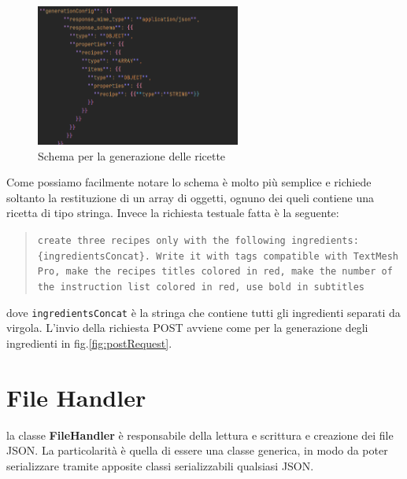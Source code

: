 \begin{figure}[H]
    \centering
    \includegraphics[width=0.6\textwidth,height=\textheight,keepaspectratio]{figures/chapter_1/recipeSchema.png}
    \caption{Schema per la generazione delle ricette}
    \label{fig:recipeSchema}
\end{figure}

Come possiamo facilmente notare lo schema è molto più semplice e richiede soltanto la restituzione di un array di oggetti, ognuno dei queli contiene una ricetta di tipo stringa.
Invece la richiesta testuale fatta è la seguente:
\begin{quote}
    \texttt{create three recipes only with the following ingredients: \{ingredientsConcat\}. Write it with tags compatible with TextMesh Pro, make the recipes titles colored in red, make the number of the instruction list colored in red, use bold in subtitles}
\end{quote}dove \texttt{ingredientsConcat} è la stringa che contiene tutti gli ingredienti separati da virgola.
L'invio della richiesta POST avviene come per la generazione degli ingredienti in fig.\ref{fig:postRequest}.

\section{File Handler}
la classe \textbf{FileHandler} è responsabile della lettura e scrittura e creazione dei file JSON. La particolarità è quella di essere una classe generica, in modo da poter serializzare tramite apposite classi serializzabili qualsiasi JSON.

